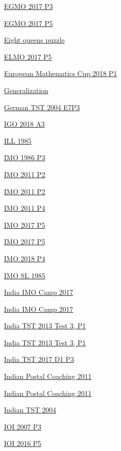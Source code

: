 \hyperref  [problem:EGMO 2017 P3]{EGMO 2017 P3}

\hyperref  [problem:EGMO 2017 P5]{EGMO 2017 P5}

\hyperref  [problem:Eight queens puzzle]{Eight queens puzzle}

\hyperref  [problem:ELMO 2017 P5]{ELMO 2017 P5}

\hyperref  [problem:European Mathematics Cup 2018 P1]{European Mathematics Cup 2018 P1}

\hyperref  [problem:Generalization]{Generalization}

\hyperref  [problem:German TST 2004 E7P3]{German TST 2004 E7P3}

\hyperref  [problem:IGO 2018 A3]{IGO 2018 A3}

\hyperref  [problem:ILL 1985]{ILL 1985}

\hyperref  [problem:IMO 1986 P3]{IMO 1986 P3}

\hyperref  [problem:IMO 2011 P2]{IMO 2011 P2}

\hyperref  [problem:IMO 2011 P2]{IMO 2011 P2}

\hyperref  [problem:IMO 2011 P4]{IMO 2011 P4}

\hyperref  [problem:IMO 2017 P5]{IMO 2017 P5}

\hyperref  [problem:IMO 2017 P5]{IMO 2017 P5}

\hyperref  [problem:IMO 2018 P4]{IMO 2018 P4}

\hyperref  [problem:IMO SL 1985]{IMO SL 1985}

\hyperref  [problem:India IMO Camp 2017]{India IMO Camp 2017}

\hyperref  [problem:India IMO Camp 2017]{India IMO Camp 2017}

\hyperref  [problem:India TST 2013 Test 3, P1]{India TST 2013 Test 3, P1}

\hyperref  [problem:India TST 2013 Test 3, P1]{India TST 2013 Test 3, P1}

\hyperref  [problem:India TST 2017 D1 P3]{India TST 2017 D1 P3}

\hyperref  [problem:Indian Postal Coaching 2011]{Indian Postal Coaching 2011}

\hyperref  [problem:Indian Postal Coaching 2011]{Indian Postal Coaching 2011}

\hyperref  [problem:Indian TST 2004]{Indian TST 2004}

\hyperref  [problem:IOI 2007 P3]{IOI 2007 P3}

\hyperref  [problem:IOI 2016 P5]{IOI 2016 P5}

